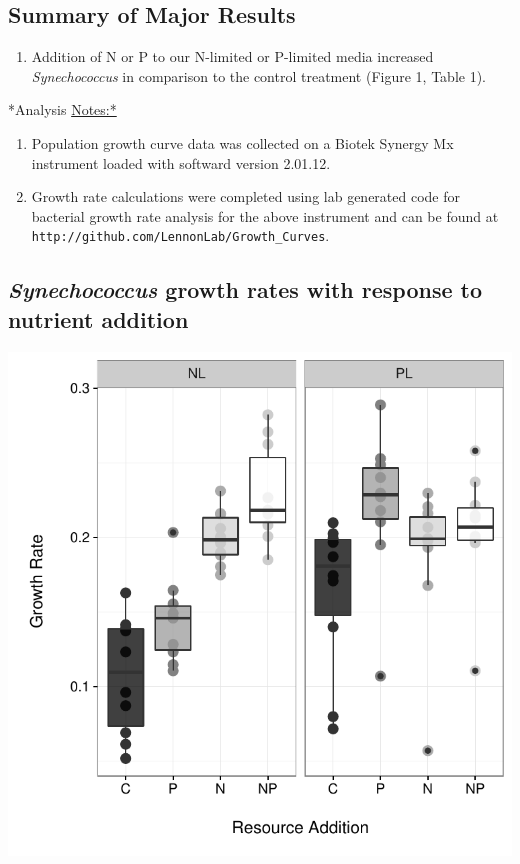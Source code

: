 \documentclass[]{article}
\providecommand{\tightlist}{%
  \setlength{\itemsep}{0pt}\setlength{\parskip}{0pt}}
\begin{document}
\subsection{Summary of Major Results}\label{summary-of-major-results}

\begin{enumerate}
\def\labelenumi{\arabic{enumi}.}
\tightlist
\item
  Addition of N or P to our N-limited or P-limited media increased
  \emph{Synechococcus} in comparison to the control treatment (Figure 1,
  Table 1).
\end{enumerate}

*Analysis \url{Notes:*}

\begin{enumerate}
\def\labelenumi{\arabic{enumi}.}
\tightlist
\item
  Population growth curve data was collected on a Biotek Synergy Mx
  instrument loaded with softward version 2.01.12.
\item
  Growth rate calculations were completed using lab generated code for
  bacterial growth rate analysis for the above instrument and can be
  found at \texttt{http://github.com/LennonLab/Growth\_Curves}.
\end{enumerate}

\newpage

\subsection{\texorpdfstring{\emph{Synechococcus} growth rates with
response to nutrient
addition}{Synechococcus growth rates with response to nutrient addition}}\label{synechococcus-growth-rates-with-response-to-nutrient-addition}

\includegraphics{analysis_ecoevostoich_files/figure-latex/gr-vis-1.pdf}
\end{document}
